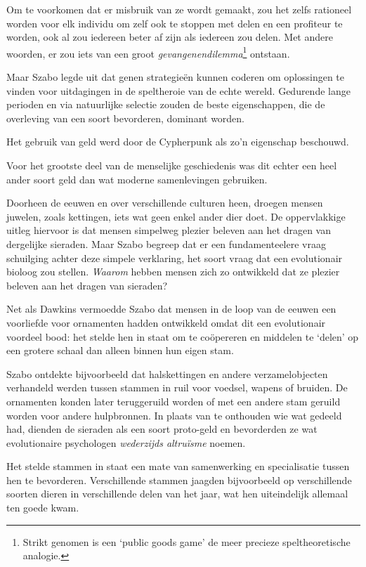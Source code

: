 \documentclass[
  a5paper,
  smalldemyvopaper,11pt,twoside,onecolumn,openright,extrafontsizes]{memoir}
\begin{document}
Om te voorkomen dat er misbruik van ze wordt gemaakt, zou het zelfs
rationeel worden voor elk individu om zelf ook te stoppen met delen en
een profiteur te worden, ook al zou iedereen beter af zijn als iedereen
zou delen. Met andere woorden, er zou iets van een groot
\emph{gevangenendilemma}\footnote{Strikt genomen is een `public goods
  game' de meer precieze speltheoretische analogie.} ontstaan.

Maar Szabo legde uit dat genen strategieën kunnen coderen om oplossingen
te vinden voor uitdagingen in de speltheroie van de echte wereld.
Gedurende lange perioden en via natuurlijke selectie zouden de beste
eigenschappen, die de overleving van een soort bevorderen, dominant
worden.

Het gebruik van geld werd door de Cypherpunk als zo'n eigenschap
beschouwd.

Voor het grootste deel van de menselijke geschiedenis was dit echter een
heel ander soort geld dan wat moderne samenlevingen gebruiken.

Doorheen de eeuwen en over verschillende culturen heen, droegen mensen
juwelen, zoals kettingen, iets wat geen enkel ander dier doet. De
oppervlakkige uitleg hiervoor is dat mensen simpelweg plezier beleven
aan het dragen van dergelijke sieraden. Maar Szabo begreep dat er een
fundamenteelere vraag schuilging achter deze simpele verklaring, het
soort vraag dat een evolutionair bioloog zou stellen. \emph{Waarom}
hebben mensen zich zo ontwikkeld dat ze plezier beleven aan het dragen
van sieraden?

Net als Dawkins vermoedde Szabo dat mensen in de loop van de eeuwen een
voorliefde voor ornamenten hadden ontwikkeld omdat dit een evolutionair
voordeel bood: het stelde hen in staat om te coöpereren en middelen te
`delen' op een grotere schaal dan alleen binnen hun eigen stam.

Szabo ontdekte bijvoorbeeld dat halskettingen en andere verzamelobjecten
verhandeld werden tussen stammen in ruil voor voedsel, wapens of
bruiden. De ornamenten konden later teruggeruild worden of met een
andere stam geruild worden voor andere hulpbronnen. In plaats van te
onthouden wie wat gedeeld had, dienden de sieraden als een soort
proto-geld en bevorderden ze wat evolutionaire psychologen
\emph{wederzijds altruïsme} noemen.

Het stelde stammen in staat een mate van samenwerking en specialisatie
tussen hen te bevorderen. Verschillende stammen jaagden bijvoorbeeld op
verschillende soorten dieren in verschillende delen van het jaar, wat
hen uiteindelijk allemaal ten goede kwam.
\end{document}
